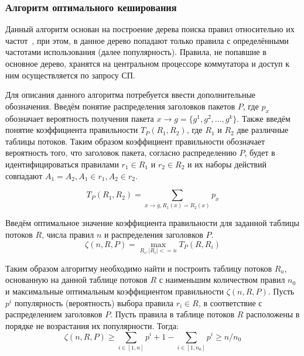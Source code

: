 \documentclass[oneside,final,12pt]{extarticle}
\begin{document}
        \subsubsection{Алгоритм оптимального кеширования}
            Данный алгоритм основан на построение дерева поиска правил относительно их частот~\cite{rottenstreich2016optimal}, при этом, в данное дерево
            попадают только правила с определёнными частотами использования (далее популярность). 
            Правила, не попавшие в основное дерево, хранятся на центральном процессоре коммутатора и  доступ к ним осуществляется по запросу СП.
            
            Для описания данного алгоритма потребуется ввести дополнительные обозначения. Введём понятие распределения заголовков пакетов \(P\),
            где \(p_x\) обозначает вероятность получения пакета \(x \rightarrow g=\{g^1,g^2,\ldots,g^k\}\).
            Также введём понятие коэффициента правильности \(T_P(R_1, R_2)\), где \(R_1\) и \(R_2\) две различные таблицы потоков. 
            Таким образом коэффициент правильности обозначает вероятность того, что заголовок пакета, согласно распределению \(P\),
            будет в идентифицироваться правилами \(r_1 \in R_1\) и \(r_2 \in R_2\) и их наборы действий совпадают \(A_1 = A_2, A_1 \in r_1, A_2 \in r_2\).
            
            \[T_P(R_1, R_2) = \sum_{x \rightarrow g, R_1(x) = R_2(x)} p_x\]

            Введём оптимальное значение коэффициента правильности для заданной таблицы потоков \(R\), числа правил \(n\) и распределения заголовков \(P\).
            \[\zeta(n, R, P) = \max_{R_i, |R_i| <= n} T_P(R, R_i)\]
            
            Таким образом алгоритму необходимо найти и построить таблицу потоков \(R_a\), основанную на данной таблице потоков \(R\)
            с наименьшим количеством правил \(n_0\) и максимальные оптимальным коэффициентом правильности \(\zeta(n, R, P)\).
            Пусть \(p^i\) популярность (вероятность) выбора правила \(r_i \in R\), в соответствие с распределением заголовков \(P\). Пусть
            правила в таблице потоков \(R\) расположены в порядке не возрастания их популярности. Тогда:
            \[\zeta(n, R, P) \geq \sum_{i \in [1, n]} p^i + 1 - \sum_{i \in [1, n_0]} p^i \geq n/n_0\]
            
\end{document}
